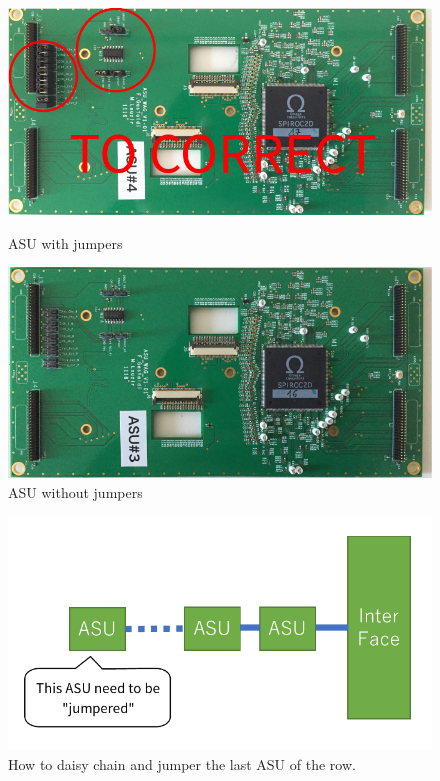 \begin{figure}[H]
  \centering
  \begin{minipage}{0.5\linewidth}
    \centering \includegraphics[width=0.98\linewidth,frame]{ASU-with-jumpers}
    \caption{ASU with jumpers}\label{fig:ASU-with-jumpers}
  \end{minipage}%
  \begin{minipage}{0.5\linewidth}
    \centering \includegraphics[width=0.98\linewidth,frame]{ASU-without-jumpers}
    \caption{ASU without jumpers}\label{fig:ASU-without-jumpers}
  \end{minipage}
\end{figure}
\begin{figure}[H]
  \centering \includegraphics[width=0.5\linewidth, frame]{ASU-daisy-chain}
  \caption{How to daisy chain and jumper the last ASU of the row.}%
  \label{ASU-daisy-chain}
\end{figure}

